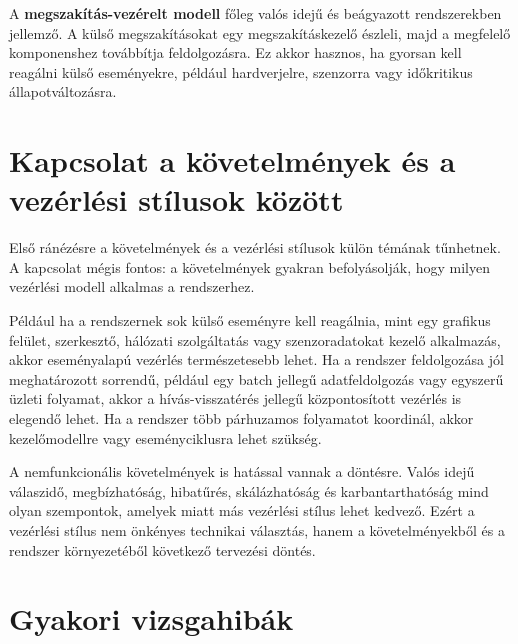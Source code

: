 A \textbf{megszakítás-vezérelt modell} főleg valós idejű és beágyazott rendszerekben jellemző. A külső megszakításokat egy megszakításkezelő észleli, majd a megfelelő komponenshez továbbítja feldolgozásra. Ez akkor hasznos, ha gyorsan kell reagálni külső eseményekre, például hardverjelre, szenzorra vagy időkritikus állapotváltozásra.

\section{Kapcsolat a követelmények és a vezérlési stílusok között}

Első ránézésre a követelmények és a vezérlési stílusok külön témának tűnhetnek. A kapcsolat mégis fontos: a követelmények gyakran befolyásolják, hogy milyen vezérlési modell alkalmas a rendszerhez.

Például ha a rendszernek sok külső eseményre kell reagálnia, mint egy grafikus felület, szerkesztő, hálózati szolgáltatás vagy szenzoradatokat kezelő alkalmazás, akkor eseményalapú vezérlés természetesebb lehet. Ha a rendszer feldolgozása jól meghatározott sorrendű, például egy batch jellegű adatfeldolgozás vagy egyszerű üzleti folyamat, akkor a hívás-visszatérés jellegű központosított vezérlés is elegendő lehet. Ha a rendszer több párhuzamos folyamatot koordinál, akkor kezelőmodellre vagy eseményciklusra lehet szükség.

A nemfunkcionális követelmények is hatással vannak a döntésre. Valós idejű válaszidő, megbízhatóság, hibatűrés, skálázhatóság és karbantarthatóság mind olyan szempontok, amelyek miatt más vezérlési stílus lehet kedvező. Ezért a vezérlési stílus nem önkényes technikai választás, hanem a követelményekből és a rendszer környezetéből következő tervezési döntés.

\section{Gyakori vizsgahibák}

